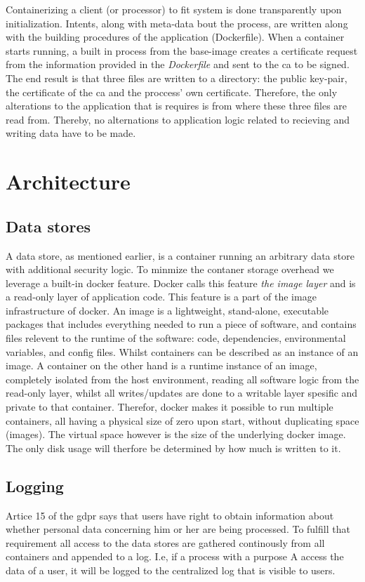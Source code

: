 \documentclass[USenglish]{uit-thesis}
\begin{document}
Containerizing a client (or processor) to fit system is done transparently upon
initialization.
Intents, along with meta-data bout the process, are written along with the building procedures
of the application (Dockerfile).
When a container starts running, a built in process from the base-image creates a certificate request
from the information provided in the \textit{Dockerfile} and sent to the \gls{ca} to be signed.
The end result is that three files are written to a directory: the public key-pair,
the certificate of the \gls{ca} and the proccess' own certificate.
Therefore, the only alterations to the application that is requires is from where
these three files are read from.
Thereby, no alternations to application logic related to recieving and writing data have
to be made.

\section{Architecture}

\subsection{Data stores}
A data store, as mentioned earlier, is a container running an arbitrary data store
with additional security logic.
To minmize the contaner storage overhead we leverage a built-in docker feature.
Docker calls this feature \textit{the image layer} and is a read-only layer of application code.
This feature is a part of the image infrastructure of docker.
An image is a lightweight, stand-alone, executable packages that includes everything
needed to run a piece of software, and contains files relevent to the runtime of the software:
code, dependencies, environmental variables, and config files.
Whilst containers can be described as an instance of an image.
A container on the other hand is a runtime instance of an image, completely isolated from the host environment, reading all software logic from the read-only layer,
whilst all writes/updates are done to a writable layer spesific and private to that container.
Therefor, docker makes it possible to run multiple containers, all having a physical size of zero upon start,
without duplicating space (images).
The virtual space however is the size of the underlying docker image.
The only disk usage will therfore be determined by how much is written to it.


\subsection{Logging}
Artice 15 of the \gls{gdpr} says that users have right to obtain information
about whether personal data concerning him or her are being processed.
To fulfill that requirement all access to the data stores are gathered continously
from all containers and appended to a log.
I.e, if a process with a purpose A access the data of a user, it will be logged to
the centralized log that is visible to users.
\end{document}
